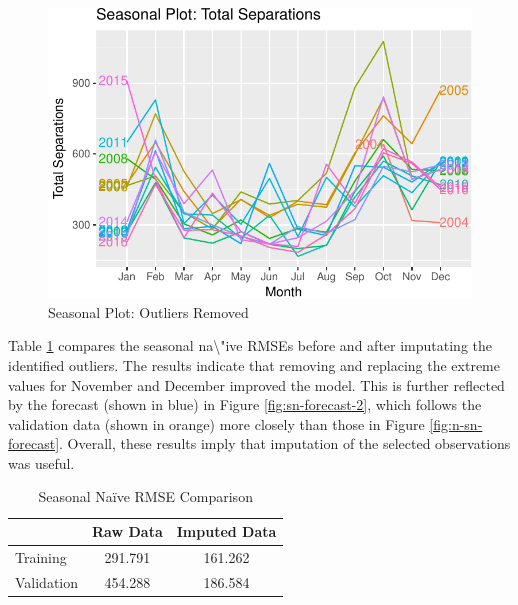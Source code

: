 \documentclass[12pt,letterpaper,toc=flat,oneside]{report}
\theoremstyle{definition}
\theoremstyle{definition}
\theoremstyle{definition}
\theoremstyle{remark}
\begin{document}
\begin{figure}[H]

{\centering \includegraphics{elliott-econometric-personnel-retention-18_files/figure-latex/response-season-plot-2-1} 

}

\caption{Seasonal Plot: Outliers Removed}\label{fig:response-season-plot-2}
\end{figure}

Table \ref{tab:season-rmse-compare} compares the seasonal
na\textbackslash{}"ive RMSEs before and after imputating the identified
outliers. The results indicate that removing and replacing the extreme
values for November and December improved the model. This is further
reflected by the forecast (shown in blue) in Figure
\ref{fig:sn-forecast-2}, which follows the validation data (shown in
orange) more closely than those in Figure \ref{fig:n-sn-forecast}.
Overall, these results imply that imputation of the selected
observations was useful.

\begin{table}[!h]

\caption{\label{tab:season-rmse-compare}Seasonal Na\"ive RMSE Comparison}
\centering
\begin{tabular}[t]{lcc}
\toprule
\bfseries{ } & \bfseries{Raw Data} & \bfseries{Imputed Data}\\
\midrule
Training & 291.791 & 161.262\\
Validation & 454.288 & 186.584\\
\bottomrule
\end{tabular}
\end{table}
\end{document}

